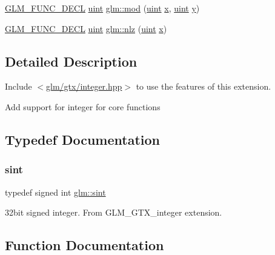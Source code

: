 \begin{DoxyCompactItemize}
\item 
\hyperlink{setup_8hpp_ab2d052de21a70539923e9bcbf6e83a51}{G\+L\+M\+\_\+\+F\+U\+N\+C\+\_\+\+D\+E\+CL} \hyperlink{group__core__precision_ga4fd29415871152bfb5abd588334147c8}{uint} \hyperlink{group__gtx__integer_gab8f9ec0ca93ca90669434224818f0750}{glm\+::mod} (\hyperlink{group__core__precision_ga4fd29415871152bfb5abd588334147c8}{uint} \hyperlink{_s_d_l__opengl_8h_ad0e63d0edcdbd3d79554076bf309fd47}{x}, \hyperlink{group__core__precision_ga4fd29415871152bfb5abd588334147c8}{uint} \hyperlink{_s_d_l__opengl_8h_a1675d9d7bb68e1657ff028643b4037e3}{y})
\item 
\hyperlink{setup_8hpp_ab2d052de21a70539923e9bcbf6e83a51}{G\+L\+M\+\_\+\+F\+U\+N\+C\+\_\+\+D\+E\+CL} \hyperlink{group__core__precision_ga4fd29415871152bfb5abd588334147c8}{uint} \hyperlink{group__gtx__integer_gacbe62fd2384464c16ea30ecc4defc11c}{glm\+::nlz} (\hyperlink{group__core__precision_ga4fd29415871152bfb5abd588334147c8}{uint} \hyperlink{_s_d_l__opengl_8h_ad0e63d0edcdbd3d79554076bf309fd47}{x})
\end{DoxyCompactItemize}


\subsection{Detailed Description}
Include $<$\hyperlink{gtx_2integer_8hpp}{glm/gtx/integer.\+hpp}$>$ to use the features of this extension.

Add support for integer for core functions 

\subsection{Typedef Documentation}
\mbox{\label{group__gtx__integer_ga73643e09d8c6d362418aec541fdb987d}} 
\subsubsection{\texorpdfstring{sint}{sint}}
{\footnotesize\ttfamily typedef signed int \hyperlink{group__gtx__integer_ga73643e09d8c6d362418aec541fdb987d}{glm\+::sint}}

32bit signed integer. From G\+L\+M\+\_\+\+G\+T\+X\+\_\+integer extension. 

\subsection{Function Documentation}
\mbox{\label{group__gtx__integer_ga8cbd3120905f398ec321b5d1836e08fb}} 
